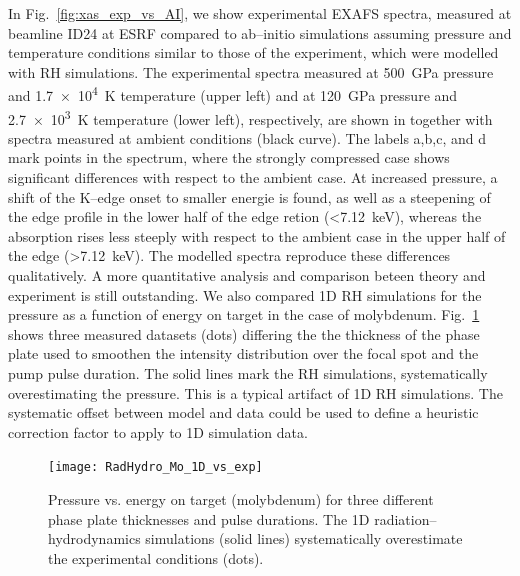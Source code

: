 \documentclass[10pt]{scrartcl}
\begin{document}
%
In Fig.~\ref{fig:xas_exp_vs_AI}, we show experimental EXAFS
spectra, measured at beamline ID24 at ESRF \cite{Torchio2016} compared to ab--initio
simulations assuming pressure and temperature conditions similar to those of
the experiment, which were modelled with RH simulations. The experimental spectra
measured at \SI{500}{\giga\pascal} pressure and \SI{1.7e4}{\kelvin} temperature
(upper left) and at \SI{120}{\giga\pascal} pressure and \SI{2.7e3}{\kelvin}
temperature (lower left), respectively, are shown in together with spectra
measured at ambient conditions (black curve). The labels a,b,c, and d mark points
in the spectrum, where the strongly compressed case shows significant
differences with respect to the ambient case. At increased pressure, a shift of
the K--edge onset to smaller energie is found, as well as a steepening of the
edge profile in the lower half of the edge retion
(\SI{<7.12}{\kilo\electronvolt}), whereas the absorption rises less steeply with respect to the
ambient case in the upper half of the edge (\SI{>7.12}{\kilo\electronvolt}).
The modelled spectra reproduce
these differences qualitatively. A more quantitative analysis and comparison
beteen theory and experiment is still outstanding.
%
We also compared 1D RH simulations for the pressure as a function
of energy on target in the case of molybdenum. Fig.~\ref{fig:rh_1d_vs_exp}
shows three measured datasets (dots) differing the the thickness of the phase plate
used to smoothen the intensity distribution over the focal spot and the pump
pulse duration. The solid lines mark the RH simulations, systematically
overestimating the pressure. This is a typical artifact of 1D RH simulations.
The systematic offset between model and data could be used to define a heuristic
correction factor to apply to 1D simulation data.
%
\begin{figure}[ht]
  \begin{center}
    \texttt{[image: RadHydro\_Mo\_1D\_vs\_exp]}
  \end{center}
  \caption{Pressure vs. energy on target (molybdenum) for three different phase plate
  thicknesses and pulse durations. The 1D radiation--hydrodynamics simulations
  (solid lines) systematically overestimate the experimental conditions (dots).}
  \label{fig:rh_1d_vs_exp}
\end{figure}
%
\end{document}
